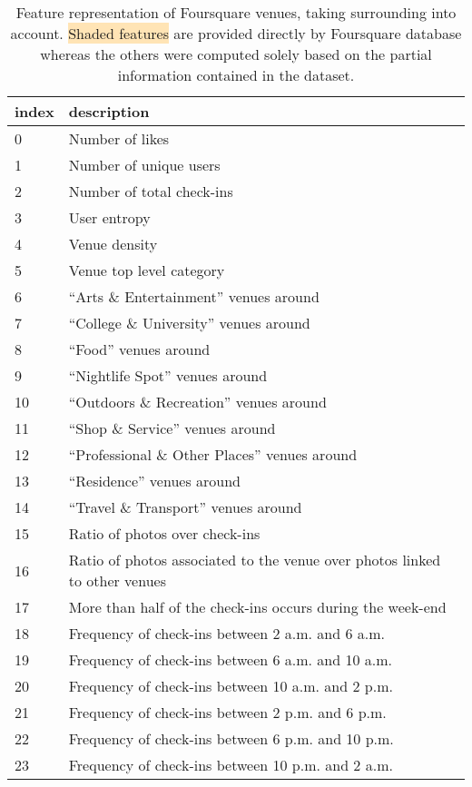 \begin{table}[hb]
    \centering
    \begin{tabularx}{\textwidth}{lX}
        \toprule
        index & description \\
        \midrule
	\datasetRow{}0 & Number of likes \\
	\datasetRow{}1 & Number of unique users \\
	\datasetRow{}2 & Number of total check-ins \\
        3 & User entropy \\
        4 & Venue density \\
	\datasetRow{}5 & Venue top level category \\
        6 & \enquote{Arts \& Entertainment} venues around \\
        7 & \enquote{College \& University} venues around \\
        8 & \enquote{Food} venues around \\
        9 & \enquote{Nightlife Spot} venues around \\
        10 & \enquote{Outdoors \& Recreation} venues around \\
        11 & \enquote{Shop \& Service} venues around \\
        12 & \enquote{Professional \& Other Places} venues around \\
        13 & \enquote{Residence} venues around \\
        14 & \enquote{Travel \& Transport} venues around \\
	15 & Ratio of photos over check-ins \\
	16 & Ratio of photos associated to the venue over photos linked to other venues \\
	17 & More than half of the check-ins occurs during the week-end \\
	18 & Frequency of check-ins between 2 a.m. and 6 a.m. \\
	19 & Frequency of check-ins between 6 a.m. and 10 a.m. \\
	20 & Frequency of check-ins between 10 a.m. and 2 p.m. \\
	21 & Frequency of check-ins between 2 p.m. and 6 p.m. \\
	22 & Frequency of check-ins between 6 p.m. and 10 p.m. \\
	23 & Frequency of check-ins between 10 p.m. and 2 a.m. \\
        \bottomrule
    \end{tabularx}
    \caption[Venue features]{Feature representation of Foursquare venues,
	    taking surrounding into account. \colorbox{Moccasin}{Shaded
	    features} are provided directly by Foursquare database whereas the
	    others were computed solely based on the partial information
	    contained in the dataset.\label{tab:venuefeatures}}
\end{table}

